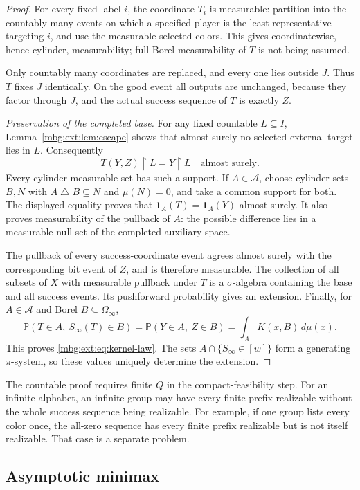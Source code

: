 \documentclass[11pt,letterpaper]{article}
\theoremstyle{definition}
\newcommand{\Prb}{\mathbb P}
\newcommand{\ind}{\mathbf 1}
\newcommand{\restr}{\mathbin{\upharpoonright}}
\newcommand{\A}{\mathcal A}
\begin{document}
\begin{proof}
For every fixed label $i$, the coordinate $T_i$ is measurable: partition into the countably many events on which a specified player is the least representative targeting $i$, and use the measurable selected colors. This gives coordinatewise, hence cylinder, measurability; full Borel measurability of $T$ is not being assumed.

Only countably many coordinates are replaced, and every one lies outside $J$. Thus $T$ fixes $J$ identically. On the good event all outputs are unchanged, because they factor through $J$, and the actual success sequence of $T$ is exactly $Z$.

\emph{Preservation of the completed base.}
For any fixed countable $L\subseteq I$, Lemma~\ref{mbg:ext:lem:escape} shows that almost surely no selected external target lies in $L$. Consequently
\[
T(Y,Z)\restr L=Y\restr L\quad\text{almost surely}.
\]
Every cylinder-measurable set has such a support. If $A\in\A$, choose cylinder sets $B,N$ with $A\mathbin\triangle B\subseteq N$ and $\mu(N)=0$, and take a common support for both. The displayed equality proves that $\ind_A(T)=\ind_A(Y)$ almost surely. It also proves measurability of the pullback of $A$: the possible difference lies in a measurable null set of the completed auxiliary space.

The pullback of every success-coordinate event agrees almost surely with the corresponding bit event of $Z$, and is therefore measurable. The collection of all subsets of $X$ with measurable pullback under $T$ is a $\sigma$-algebra containing the base and all success events. Its pushforward probability gives an extension. Finally, for $A\in\A$ and Borel $B\subseteq\Omega_\infty$,
\[
\Prb(T\in A,\ S_\infty(T)\in B)
=\Prb(Y\in A,\ Z\in B)
=\int_A K(x,B)\,d\mu(x).
\]
This proves \eqref{mbg:ext:eq:kernel-law}. The sets $A\cap\{S_\infty\in[w]\}$ form a generating $\pi$-system, so these values uniquely determine the extension.
\end{proof}

The countable proof requires finite $Q$ in the compact-feasibility step. For an infinite alphabet, an infinite group may have every finite prefix realizable without the whole success sequence being realizable. For example, if one group lists every color once, the all-zero sequence has every finite prefix realizable but is not itself realizable. That case is a separate problem.

\subsection{Asymptotic minimax}
\end{document}
